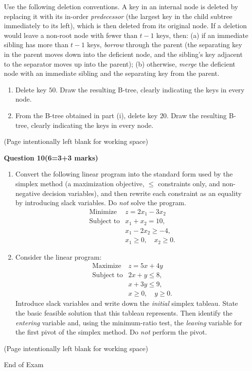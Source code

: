 \documentclass[12pt,letterpaper]{article}
\newcommand{\marksbox}[1]{%
  \vfill
  \begin{flushright}
    \fbox{\parbox[c][1.1cm][c]{1.3cm}{\centering #1}}
  \end{flushright}
}
\newcommand{\questiontitle}[2]{%
  \textbf{Question #1}\hfill\textbf{(#2 marks)}
}
\newcommand{\workingpage}{%
  \newpage
  \begin{center}
    (Page intentionally left blank for working space)
  \end{center}
}
\begin{document}
Use the following deletion conventions. A key in an internal node is deleted
by replacing it with its in-order \emph{predecessor} (the largest key in the
child subtree immediately to its left), which is then deleted from its
original node. If a deletion would leave a non-root node with fewer than
$t - 1$ keys, then: (a) if an immediate sibling has more than $t - 1$ keys,
\emph{borrow} through the parent (the separating key in the parent moves down
into the deficient node, and the sibling's key adjacent to the separator
moves up into the parent); (b) otherwise, \emph{merge} the deficient node
with an immediate sibling and the separating key from the parent.

\begin{enumerate}
  \item[(i)] Delete key $50$. Draw the resulting B-tree, clearly indicating
  the keys in every node.

  \item[(ii)] From the B-tree obtained in part (i), delete key $20$. Draw the
  resulting B-tree, clearly indicating the keys in every node.
\end{enumerate}

\marksbox{6}

\workingpage
\newpage

\questiontitle{10}{6=3+3}

\begin{enumerate}
  \item[(i)] Convert the following linear program into the standard form used
  by the simplex method (a maximization objective, $\leq$ constraints only,
  and non-negative decision variables), and then rewrite each constraint as
  an equality by introducing slack variables. Do \emph{not} solve the
  program.
  \[
  \begin{array}{rl}
  \text{Minimize} & z = 2x_1 - 3x_2 \\
  \text{Subject to} & x_1 + x_2 = 10, \\
                    & x_1 - 2x_2 \geq -4, \\
                    & x_1 \geq 0,\quad x_2 \geq 0.
  \end{array}
  \]

  \item[(ii)] Consider the linear program:
  \[
  \begin{array}{rl}
  \text{Maximize} & z = 5x + 4y \\
  \text{Subject to} & 2x + y \leq 8, \\
                    & x + 3y \leq 9, \\
                    & x \geq 0,\quad y \geq 0.
  \end{array}
  \]
  Introduce slack variables and write down the \emph{initial} simplex
  tableau. State the basic feasible solution that this tableau represents.
  Then identify the \emph{entering} variable and, using the minimum-ratio
  test, the \emph{leaving} variable for the first pivot of the simplex
  method. Do \emph{not} perform the pivot.
\end{enumerate}

\marksbox{6}

\workingpage

\vfill
\begin{center}
  End of Exam
\end{center}
\end{document}
